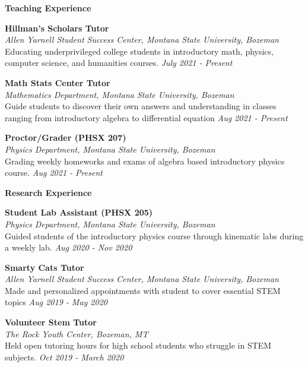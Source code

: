 \documentclass[12pt]{article}
\begin{document}
\newpage
\begin{minipage}[b]{0.2\linewidth}
\textbf{Teaching Experience}
\end{minipage} %
\begin{minipage}{0.8\linewidth}
\noindent
\textbf{Hillman's Scholars Tutor}\\
\textit{Allen Yarnell Student Success Center, Montana State University, Bozeman}\\
Educating underprivileged college students in introductory math, physics, computer science, and humanities courses. \hfill
\textit{July 2021 - Present}

\noindent
\textbf{Math Stats Center Tutor}\\
\textit{Mathematics Department, Montana State University, Bozeman}\\
Guide students to discover their own answers and understanding in classes ranging from introductory algebra to differential equation \hfill
\textit{Aug 2021 - Present}

\noindent
\textbf{Proctor/Grader (PHSX 207)}\\
\textit{Physics Department, Montana State University, Bozeman}\\
Grading weekly homeworks and exams of algebra based introductory physics course. 	  \hfill
\textit{Aug 2021 - Present}
\end{minipage}
\bigskip

\begin{minipage}[b]{0.2\linewidth}
\textbf{Research Experience}
\end{minipage} %
\begin{minipage}{0.8\linewidth}
\noindent
\textbf{Student Lab Assistant (PHSX 205)}\\
\textit{Physics Department, Montana State University, Bozeman}\\
Guided students of the introductory physics course through kinematic labs during a weekly lab.	  \hfill
\textit{Aug 2020 - Nov 2020}

\noindent
\textbf{Smarty Cats Tutor}\\
\textit{Allen Yarnell Student Success Center, Montana State University, Bozeman}\\
Made and personalized appointments with student to cover essential STEM topics	  \hfill
\textit{Aug 2019 - May 2020}

\noindent
\textbf{Volunteer Stem Tutor}\\
\textit{The Rock Youth Center, Bozeman, MT}\\
Held open tutoring hours for high school students who struggle in STEM subjects.	  \hfill
\textit{Oct 2019 - March 2020}
\end{minipage}
\end{document}
